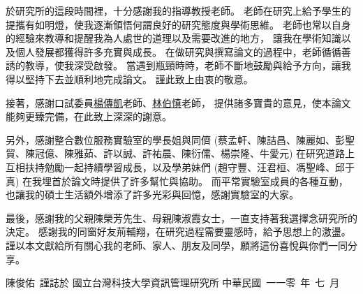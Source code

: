 
\begin{acknowledgement}

    於研究所的這段時間裡，十分感謝我的指導教授\underline{\advisor}老師。
老師在研究上給予學生的提攜有如明燈，使我逐漸領悟何謂良好的研究態度與學術思維。
老師也常以自身的經驗來教導和提醒我為人處世的道理以及需要改進的地方，
讓我在學術知識以及個人發展都獲得許多充實與成長。
在做研究與撰寫論文的過程中，老師循循善誘的教導，使我深受啟發。
當遇到瓶頸時時，老師不斷地鼓勵與給予方向，讓我得以堅持下去並順利地完成論文。
謹此致上由衷的敬意。

    接著，感謝口試委員\underline{楊傳凱}老師、\underline{林伯慎}老師，
提供諸多寶貴的意見，使本論文能夠更臻完備，在此致上深深的謝意。

    另外，感謝整合數位服務實驗室的學長姐與同儕
(蔡孟軒、陳詰昌、陳麗如、彭聖貿、陳冠億、陳雅茹、許以誠、許祐晨、陳衍儒、楊崇隆、牛愛元)
在研究道路上互相扶持勉勵一起持續學習成長，以及學弟妹們
(趙守豐、汪君桓、馮聖峰、邱于真)
在我埋首於論文時提供了許多幫忙與協助。
而平常實驗室成員的各種互動，也讓我的碩士生活額外增添了許多光彩與回憶，感謝實驗室的大家。

    最後，感謝我的父親陳榮芳先生、母親陳淑霞女士，一直支持著我選擇念研究所的決定。
感謝我的同窗好友荊輔翔，在研究過程需要靈感時，給予思想上的激盪。
謹以本文獻給所有關心我的老師、家人、朋友及同學，願將這份喜悅與你們一同分享。

\mbox{}
\vfill
\mbox{}\hfill 陳俊佑~謹誌於
\newline
\mbox{}\hfill 國立台灣科技大學資訊管理研究所
\newline
\mbox{}\hfill 中華民國~一一零~年~七~月
\bigbreak

\end{acknowledgement}
